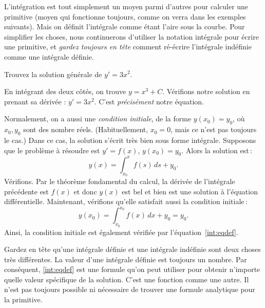 L'intégration est tout simplement un moyen parmi d'autres pour calculer une primitive (moyen qui fonctionne toujours, comme on verra dans les exemples suivants).  Mais on définit l'intégrale comme étant l'aire sous la courbe.  Pour simplifier les choses, nous continuerons d'utiliser la notation intégrale pour écrire une primitive, et \emph{gardez toujours en tête} comment ré-écrire l'intégrale indéfinie comme une intégrale définie.

\begin{example}
Trouvez la solution générale de $y' = 3 x^2$.

En intégrant des deux côtés, on trouve $y = x^3 + C$.  Vérifions notre solution en prenant sa dérivée : 
$y' = 3x^2$.  C'est \emph{précisément} notre équation.
\end{example}

Normalement, on a aussi une {\em condition initiale}, de la forme $y(x_0) = y_0$, où $x_0,y_0$ sont des nombre réels.  (Habituellement, $x_0=0$, mais ce n'est pas toujours le cas.)  Dans ce cas, la solution s'écrit très bien sous forme intégrale.  Supposons que le problème à résoudre est $y' = f(x)$, $y(x_0) = y_0$. Alors la solution est\,:
%
\begin{equation} \label{int:eqdef}
y(x) = \int_{x_0}^x f(s) \,ds + y_0 .
\end{equation}
Vérifions.  Par le théorème fondamental du calcul, la dérivée de l'intégrale précédente est $f(x)$ et donc $y(x)$ est bel et bien est une solution à l'équation différentielle.  Maintenant, vérifions qu'elle satisfait aussi la condition initiale\,:
\begin{equation*}
y(x_0) = \int_{x_0}^{x_0} f(x)\,dx + y_0 = y_0.
\end{equation*}
Ainsi, la condition initiale est également vérifiée par l'équation~\eqref{int:eqdef}.

Gardez en tête qu'une intégrale définie et une intégrale indéfinie sont deux choses très différentes.  La valeur d'une intégrale définie est toujours un nombre.  Par conséquent, \eqref{int:eqdef} est une formule qu'on peut utiliser pour obtenir n'importe quelle valeur spécifique de la solution.  C'est une fonction comme une autre.  Il n'est pas toujours possible ni nécessaire de trouver une formule analytique pour la primitive. 


